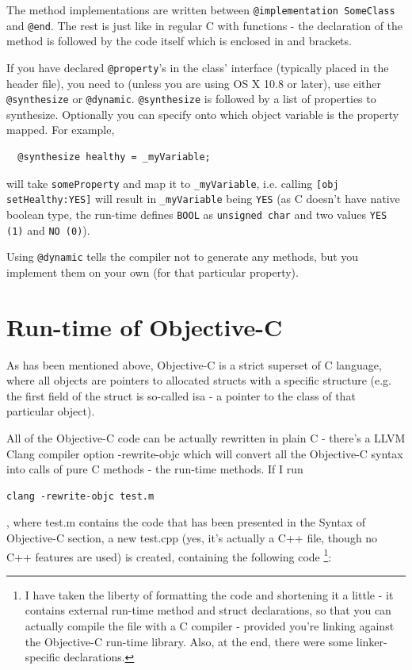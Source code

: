 \documentclass[a4paper, 11pt, fleqn]{book}
\begin{document}
The method implementations are written between \verb=@implementation SomeClass= and \verb=@end=. The rest is just like in regular C with functions - the declaration of the method is followed by the code itself which is enclosed in { and } brackets.

If you have declared \verb=@property='s in the class' interface (typically placed in the header file), you need to (unless you are using OS X 10.8 or later), use either \verb=@synthesize= or \verb=@dynamic=. \verb=@synthesize= is followed by a list of properties to synthesize. Optionally you can specify onto which object variable is the property mapped. For example,

\begin{verbatim}
  @synthesize healthy = _myVariable;
\end{verbatim}

will take \verb=someProperty= and map it to \verb=_myVariable=, i.e. calling \verb=[obj setHealthy:YES]= will result in \verb=_myVariable= being \verb=YES= (as C doesn't have native boolean type, the run-time defines \verb=BOOL= as \verb=unsigned char= and two values \verb=YES (1)= and \verb=NO (0)=).

Using \verb=@dynamic= tells the compiler not to generate any methods, but you implement them on your own (for that particular property).


\section{Run-time of Objective-C}

As has been mentioned above, Objective-C is a strict superset of C language, where all objects are pointers to allocated structs with a specific structure (e.g. the first field of the struct is so-called isa - a pointer to the class of that particular object).
  
All of the Objective-C code can be actually rewritten in plain C - there's a LLVM Clang compiler option -rewrite-objc which will convert all the Objective-C syntax into calls of pure C methods - the run-time methods. If I run \begin{verbatim}clang -rewrite-objc test.m\end{verbatim}, where test.m contains the code that has been presented in the Syntax of Objective-C section, a new test.cpp (yes, it's actually a C++ file, though no C++ features are used) is created, containing the following code \footnote{I have taken the liberty of formatting the code and shortening it a little - it contains external run-time method and struct declarations, so that you can actually compile the file with a C compiler - provided you're linking against the Objective-C run-time library. Also, at the end, there were some linker-specific declarations.}:
\end{document}

